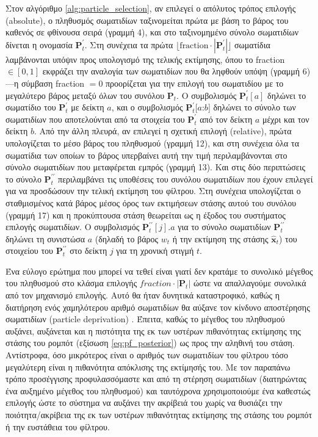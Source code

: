 Στον αλγόριθμο \ref{alg:particle_selection}, αν επιλεγεί ο απόλυτος τρόπος
επιλογής (absolute), ο πληθυσμός σωματιδίων ταξινομείται πρώτα με βάση το βάρος
του καθενός σε φθίνουσα σειρά (γραμμή 4), και στο ταξινομημένο σύνολο
σωματιδίων δίνεται η ονομασία $\bm{P}_t^\prime$. Στη συνέχεια τα πρώτα $\lfloor
\text{fraction}\cdot|\bm{P}_t^\prime| \rfloor$ σωματίδια λαμβάνονται υπόψιν
προς υπολογισμό της τελικής εκτίμησης, όπου το fraction $\in [0,1]$ εκφράζει
την αναλογία των σωματιδίων που θα ληφθούν υπόψη (γραμμή 6)---η σύμβαση
fraction $=0$ προορίζεται για την επιλογή του σωματιδίου με το μεγαλύτερο βάρος
μεταξύ όλων του συνόλου $\bm{P}_t$. Ο συμβολισμός $\bm{P}_t^\prime[a]$ δηλώνει
το σωματίδιο του $\bm{P}_t^\prime$ με δείκτη $a$, και ο συμβολισμός
$\bm{P}_t^\prime[a$:$b]$ δηλώνει το σύνολο των σωματιδίων που αποτελούνται από
τα στοιχεία του $\bm{P}_t^\prime$ από τον δείκτη $a$ μέχρι και τον δείκτη $b$.
Από την άλλη πλευρά, αν επιλεγεί η σχετική επιλογή (relative), πρώτα
υπολογίζεται το μέσο βάρος του πληθυσμού (γραμμή 12), και στη συνέχεια όλα τα
σωματίδια των οποίων το βάρος υπερβαίνει αυτή την τιμή περιλαμβάνονται στο
σύνολο σωματιδίων που μεταφέρεται εμπρός (γραμμή 13).  Και στις δύο περιπτώσεις
το σύνολο $\bm{P}_t^{\prime\prime}$ περιλαμβάνει τις υποθέσεις του συνόλου
σωματιδίων που έχουν επιλεγεί για να προσδώσουν την τελική εκτίμηση του
φίλτρου.  Στη συνέχεια υπολογίζεται ο σταθμισμένος κατά βάρος μέσος όρος των
εκτιμήσεων στάσης αυτού του συνόλου (γραμμή 17) και η προκύπτουσα στάση
θεωρείται ως η έξοδος του συστήματος επιλογής σωματιδίων. Ο συμβολισμός
$\bm{P}_t^{\prime\prime}[j].a$ για το σύνολο σωματιδίων
$\bm{P}_t^{\prime\prime}$ δηλώνει τη συνιστώσα $a$ (δηλαδή το βάρος $w_t$ ή την
εκτίμηση της στάσης $\hat{\bm{x}}_t$) του στοιχείου του
$\bm{P}_t^{\prime\prime}$ στο δείκτη $j$ για τη χρονική στιγμή $t$.

Ένα εύλογο ερώτημα που μπορεί να τεθεί είναι γιατί δεν κρατάμε το συνολικό
μέγεθος του πληθυσμού στο κλάσμα επιλογής $fraction \cdot |\bm{P}_t|$ ώστε να
απαλλαγούμε συνολικά από τον μηχανισμό επιλογής. Αυτό θα ήταν δυνητικά
καταστροφικό, καθώς η διατήρηση ενός χαμηλότερου αριθμό σωματιδίων θα αύξανε
τον κίνδυνο αποστέρησης σωματιδίων (particle deprivation)
\cite{thrun2005probabilistic}. Έπειτα, καθώς το μέγεθος του πληθυσμού αυξάνει,
αυξάνεται και η πιστότητα της εκ των υστέρων πιθανότητας εκτίμησης της στάσης
του ρομπότ (εξίσωση \ref{eq:pf_posterior}) ως προς την αληθινή του στάση.
Αντίστροφα, όσο μικρότερος είναι ο αριθμός των σωματιδίων του φίλτρου τόσο
μεγαλύτερη είναι η πιθανότητα απόκλισης της εκτίμησής του. Με τον παραπάνω
τρόπο προσέγγισης προφυλασσόμαστε και από τη στέρηση σωματιδίων (διατηρώντας
ένα αυξημένο μέγεθος του πληθυσμού) και ταυτόχρονα χρησιμοποιούμε ένα καθεστώς
επιλογής ώστε το σύστημα να αυξάνει την ακρίβειά του χωρίς να θυσιάζει την
ποιότητα/ακρίβεια της εκ των υστέρων πιθανότητας εκτίμησης της στάσης του
ρομπότ ή την ευστάθεια του φίλτρου.

